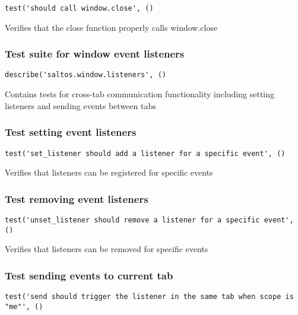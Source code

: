 \documentclass[a4paper]{article}
\begin{document}
\begin{lstlisting}
test('should call window.close', ()
\end{lstlisting}

Verifies that the close function properly calls window.close

\hypertarget{toc292}{}
\subsubsection{Test suite for window event listeners}

\begin{lstlisting}
describe('saltos.window.listeners', ()
\end{lstlisting}

Contains tests for cross-tab communication functionality
including setting listeners and sending events between tabs

\hypertarget{toc293}{}
\subsubsection{Test setting event listeners}

\begin{lstlisting}
test('set_listener should add a listener for a specific event', ()
\end{lstlisting}

Verifies that listeners can be registered for specific events

\hypertarget{toc294}{}
\subsubsection{Test removing event listeners}

\begin{lstlisting}
test('unset_listener should remove a listener for a specific event', ()
\end{lstlisting}

Verifies that listeners can be removed for specific events

\hypertarget{toc295}{}
\subsubsection{Test sending events to current tab}

\begin{lstlisting}
test('send should trigger the listener in the same tab when scope is "me"', ()
\end{lstlisting}
\end{document}
